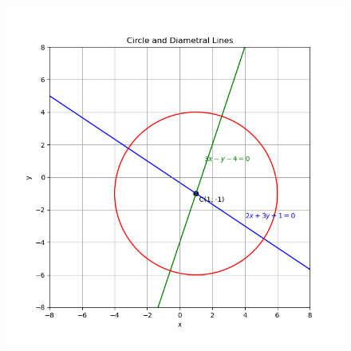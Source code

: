 \documentclass[journal]{IEEEtran}
\begin{document}
\begin{figure}[ht!]
\centering
\includegraphics[height=0.6\textheight, keepaspectratio]{figs/circle.png}
\end{figure}
\end{document}
